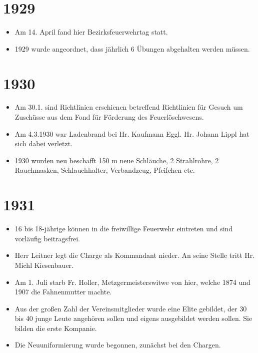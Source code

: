 \documentclass[12pt,a4paper]{book}
\begin{document}
\section*{1929}

\begin{itemize}
\item Am 14. April fand hier Bezirksfeuerwehrtag statt.

\item 1929 wurde angeordnet, dass jährlich 6 Übungen abgehalten werden müssen.
\end{itemize}

\section*{1930}

\begin{itemize}
\item Am 30.1. sind Richtlinien erschienen betreffend Richtlinien für Gesuch um
Zuschüsse aus dem Fond für Förderung des Feuerlöschwesens.

\item Am 4.3.1930 war Ladenbrand bei Hr. Kaufmann Eggl. Hr. Johann Lippl hat
sich dabei verletzt.

\item 1930 wurden neu beschafft 150 m neue Schläuche, 2 Strahlrohre, 2
Rauchmasken, Schlauchhalter, Verbandzeug, Pfeifchen etc.
\end{itemize}

\section*{1931}

\begin{itemize}
\item 16 bis 18-jährige können in die freiwillige Feuerwehr eintreten und sind
vorläufig beitragsfrei.

\item Herr Leitner legt die Charge als Kommandant nieder. An seine Stelle tritt
Hr. Michl Kiesenbauer.

\item Am 1. Juli starb Fr. Holler, Metzgermeisterswitwe von hier, welche 1874
und 1907 die Fahnenmutter machte.

\item Aus der großen Zahl der Vereinsmitglieder wurde eine Elite gebildet, der
30 bis 40 junge Leute angehören sollen und eigens ausgebildet werden sollen. Sie
bilden die erste Kompanie.

\item Die Neuuniformierung wurde begonnen, zunächst bei den Chargen.
\end{itemize}
\end{document}
